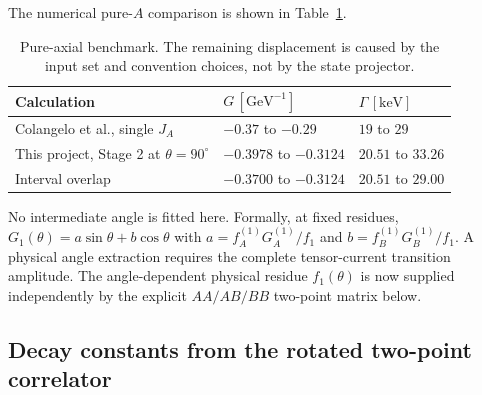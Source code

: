 \documentclass[11pt]{article}
\begin{document}
The numerical pure-$A$ comparison is shown in
Table~\ref{tab:colangelo-projection-comparison}.
\begin{table}[H]
  \centering
  \small
  \begin{tabular}{lll}
    \toprule
    Calculation & $G\,[\mathrm{GeV}^{-1}]$ & $\Gamma\,[\mathrm{keV}]$\\
    \midrule
    Colangelo et al., single $J_A$
      & $-0.37$ to $-0.29$ & $19$ to $29$\\
    This project, Stage 2 at $\theta=90^\circ$
      & $-0.3978$ to $-0.3124$ & $20.51$ to $33.26$\\
    Interval overlap
      & $-0.3700$ to $-0.3124$ & $20.51$ to $29.00$\\
    \bottomrule
  \end{tabular}
  \caption{Pure-axial benchmark.  The remaining displacement is caused by the
  input set and convention choices, not by the state projector.}
  \label{tab:colangelo-projection-comparison}
\end{table}
No intermediate angle is fitted here.  Formally, at fixed residues,
$G_1(\theta)=a\sin\theta+b\cos\theta$ with
$a=f_A^{(1)}G_A^{(1)}/f_1$ and
$b=f_B^{(1)}G_B^{(1)}/f_1$.  A physical angle extraction requires the
complete tensor-current transition amplitude.  The angle-dependent physical
residue $f_1(\theta)$ is now supplied independently by the explicit
$AA/AB/BB$ two-point matrix below.

\subsection{Decay constants from the rotated two-point correlator}
\end{document}
